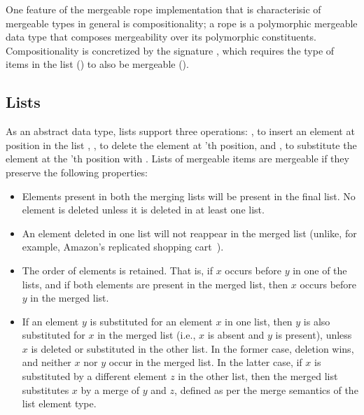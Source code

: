 One feature of the mergeable rope implementation that is characterisic
of mergeable types in general is compositionality; a rope is a
polymorphic mergeable data type that composes mergeability over its
polymorphic constituents.   Compositionality is concretized by the
 signature , which requires the type of items in the list
() to also be mergeable ().

\subsection{Lists}
\label{sec:lists}



As an abstract data type, lists support three operations: , to insert an element  at position  in the list
, , to delete the element at 'th position, and
, to substitute the element at the 'th position
with .  Lists of mergeable items are mergeable if they preserve
the following properties:
\begin{itemize}
  \item Elements present in both the merging lists will be present in
  the final list. No element is deleted unless it is deleted in at
  least one list.
  \item An element deleted in one list will not reappear in the merged
  list (unlike, for example, Amazon's replicated shopping cart~\cite{Dynamo}).
  \item The order of elements is retained. That is, if $x$ occurs
  before $y$ in one of the lists, and if both elements are present in
  the merged list, then $x$ occurs before $y$ in the merged list.
\item If an element $y$ is substituted for an element $x$ in one list,
  then $y$ is also substituted for $x$ in the merged list (i.e., $x$
  is absent and $y$ is present), unless $x$ is deleted or substituted
  in the other list. In the former case, deletion wins, and neither
  $x$ nor $y$ occur in the merged list. In the latter case, if $x$ is
  substituted by a different element $z$ in the other list, then the
  merged list substitutes $x$ by a merge of $y$ and $z$, defined as
  per the merge semantics of the list element type.
\end{itemize}

